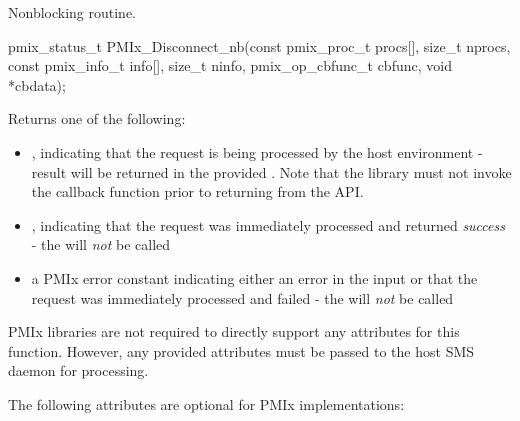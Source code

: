 \summary

Nonblocking  routine.

\format

\cspecificstart
\begin{codepar}
pmix_status_t
PMIx_Disconnect_nb(const pmix_proc_t procs[], size_t nprocs,
                   const pmix_info_t info[], size_t ninfo,
                   pmix_op_cbfunc_t cbfunc, void *cbdata);
\end{codepar}
\cspecificend

\begin{arglist}
\end{arglist}

Returns one of the following:

\begin{itemize}
    \item {}, indicating that the request is being processed by the host environment - result will be returned in the provided . Note that the library must not invoke the callback function prior to returning from the \ac{API}.
    \item {}, indicating that the request was immediately processed and returned \textit{success} - the  will \textit{not} be called
    \item a PMIx error constant indicating either an error in the input or that the request was immediately processed and failed - the  will \textit{not} be called
\end{itemize}

\reqattrstart
\ac{PMIx} libraries are not required to directly support any attributes for this function. However, any provided attributes must be passed to the host \ac{SMS} daemon for processing.

\reqattrend

\optattrstart
The following attributes are optional for \ac{PMIx} implementations:



